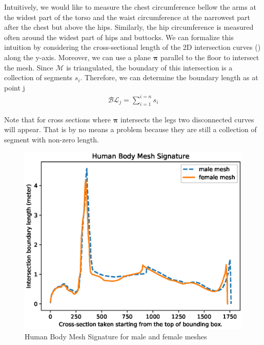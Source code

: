 \documentclass[10pt,twocolumn,letterpaper]{article}
\begin{document}
Intuitively, we would like to measure the chest circumference bellow the arms 
at the widest part of the torso and the waist circumference at the 
narrowest part after the chest but above the hips. Similarly, the hip 
circumference is measured often around the widest part of hips and buttocks. We 
can formalize this intuition by considering the cross-sectional length of the 
2D intersection curves (\cite{book.compu.topo}) along the y-axis. Moreover, we 
can 
use a plane $\boldsymbol{\pi}$ parallel to the floor to intersect the mesh. 
Since $\mathcal{M}$ is 
triangulated, the boundary of this 
intersection is a collection of segments $s_i$. Therefore, we can 
determine the boundary length as at point j
\begin{align}
\mathcal{BL}_j = \sum_{i = 1}^{i = n}s_i
\end{align}

Note that for cross sections where $\boldsymbol{\pi}$ intersects the legs two 
disconnected curves will appear. That is by no means a problem because they are 
still a collection of segment with non-zero length.

\begin{figure}[t]
	\begin{center}
		\includegraphics[width=\linewidth]{Figure_1.eps}
	\end{center}
	\caption{Human Body Mesh Signature for male and female meshes}
	\label{fig:hbm_signature}
\end{figure}
\end{document}
